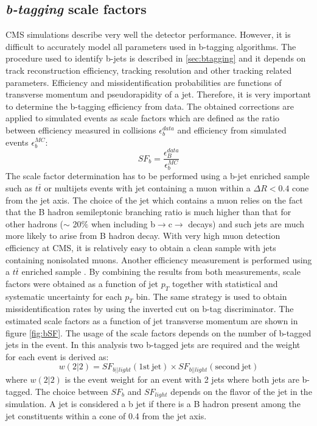 
\subsection{\textit{b-tagging} scale factors}
\label{sec:btag}

CMS simulations describe very well the detector performance. However, it is difficult to accurately model all parameters used in b-tagging algorithms. The procedure used to identify b-jets is described in \ref{sec:btagging} and it depends on track reconstruction efficiency, tracking resolution and other tracking related parameters. Efficiency and missidentification probabilities are functions of transverse momentum and pseudorapidity of a jet. Therefore, it is very important to determine the b-tagging efficiency from data. The obtained corrections are applied to simulated events as scale factors which are defined as the ratio between efficiency measured in collisions $\epsilon_b^{data}$ and efficiency from simulated events $\epsilon_b^{MC}$:
\begin{equation}
SF_b=\frac{\epsilon_B^{data}}{\epsilon_b^{MC}}
\end{equation}
The scale factor determination has to be performed using a b-jet enriched sample such as $t\bar{t}$ or multijets events with jet containing a muon within a $\Delta R <0.4$ cone from the jet axis. The choice of the jet which contains a muon relies on the fact that the B hadron semileptonic branching ratio is much higher than that for other hadrons ($\sim$ 20$\%$ when including b$\rightarrow$c$\rightarrow$ decays) and such jets are much more likely to arise from B hadron decay. With very high muon detection efficiency at CMS, it is relatively easy to obtain a clean sample with jets containing nonisolated muons. Another efficiency measurement is performed using a $t\bar{t}$ enriched sample \cite{CMS:2013vea}.
By combining the results from both measurements, scale factors were obtained as a function of jet $p_T$ together with statistical and systematic uncertainty for each $p_T$ bin. The same strategy is used to obtain missidentification rates by using the inverted cut on b-tag discriminator. The estimated scale factors as a function of jet transverse momentum are shown in figure \ref{fig:bSF}.  
The usage of the scale factors depends on the number of b-tagged jets in the event. In this analysis two b-tagged jets are required and the weight for each event is derived as:
\begin{equation}
w(2|2)=SF_{b||light}(\mathrm{1st\ jet})\times SF_{b||light}(\mathrm{second\ jet})
\end{equation}
where $w(2|2)$ is the event weight for an event with 2 jets where both jets are b-tagged. The choice between $SF_{b}$ and $SF_{light}$ depends on the flavor of the jet in the simulation. A jet is considered a b jet if there is a B hadron present among the jet constituents within a cone of 0.4 from the jet axis.    

